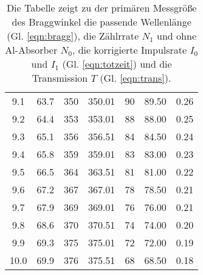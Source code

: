 \begin{table}
\begin{tabular}{c | c | c | c | c | c | c}
        9.1 & 63.7 & 350 & 350.01 & 90& 89.50 & 0.26\\
        9.2 & 64.4 & 353 & 353.01 & 88& 88.00 & 0.25\\
        9.3 & 65.1 & 356 & 356.51 & 84& 84.50 & 0.24\\
        9.4 & 65.8 & 359 & 359.01 & 83& 83.00 & 0.23\\
        9.5 & 66.5 & 364 & 363.51 & 81& 81.00 & 0.22\\
        9.6 & 67.2 & 367 & 367.01 & 78& 78.50 & 0.21\\
        9.7 & 67.9 & 369 & 369.01 & 76& 76.00 & 0.21\\
        9.8 & 68.6 & 370 & 370.51 & 74& 74.00 & 0.20\\
        9.9 & 69.3 & 375 & 375.01 & 72& 72.00 & 0.19\\
        10.0 & 69.9 & 376 & 375.51 & 68& 68.50 & 0.18\\
    \bottomrule 
    \end{tabular}
    \caption{Die Tabelle zeigt zu der primären Messgröße des Braggwinkel die passende Wellenlänge
    (Gl. \ref{eqn:bragg}), die Zählrrate $N_1$ und ohne Al-Absorber $N_0$, die korrigierte
    Impulsrate $I_0$ und $I_1$ (Gl. \ref{eqn:totzeit}) und die Transmission $T$ (Gl. \ref{eqn:trans}). }
\end{table}

\label{sec:anhang}

